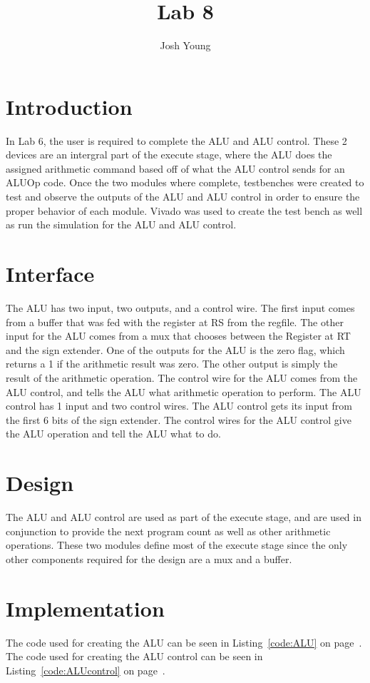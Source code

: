\documentclass{article}
\author{Josh Young}
\title{Lab 8}
\begin{document}
\maketitle

\section{Introduction}
In Lab 6, the user is required to complete the ALU and ALU control. These 2 devices are an intergral part of the execute stage, where the ALU does the assigned arithmetic command based off of what the ALU control sends for an ALUOp code. Once the two modules where complete, testbenches were created to test and observe the outputs of the ALU and ALU control in order to ensure the proper behavior of each module. Vivado was used to create the test bench as well as run the simulation for the ALU and ALU control.

\section{Interface}
The ALU has two input, two outputs, and a control wire. The first input comes from a buffer that was fed with the register at RS from the regfile. The other input for the ALU comes from a mux that chooses between the Register at RT and the sign extender. One of the outputs for the ALU is the zero flag, which returns a 1 if the arithmetic result was zero. The other output is simply the result of the arithmetic operation. The control wire for the ALU comes from the ALU control, and tells the ALU what arithmetic operation to perform.
The ALU control has 1 input and two control wires. The ALU control gets its input from the first 6 bits of the sign extender. The control wires for the ALU control give the ALU operation and tell the ALU what to do.


\section{Design}
The ALU and ALU control are used as part of the execute stage, and are used in conjunction to provide the next program count as well as other arithmetic operations. These two modules define most of the execute stage since the only other components required for the design are a mux and a buffer.

\section{Implementation}
The code used for creating the ALU can be seen in Listing~\ref{code:ALU} on page~\pageref{code:ALU}. The code used for creating the ALU control can be seen in Listing~\ref{code:ALUcontrol} on page~\pageref{code:ALUcontrol}.
\end{document}
